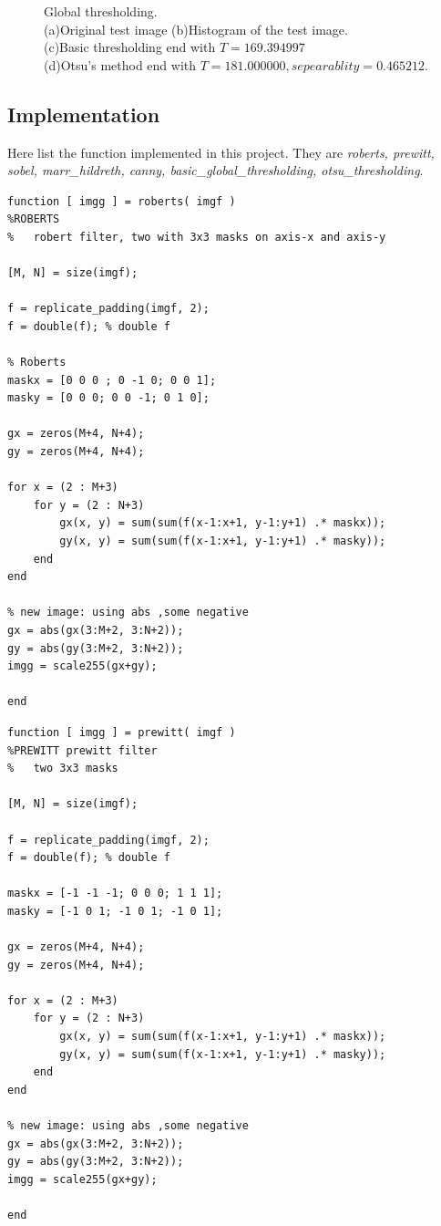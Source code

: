 \begin{figure}[h!]
	\caption{Global thresholding. \\(a)Original test image (b)Histogram of the test image. \\(c)Basic thresholding end with $T=169.394997$\\ (d)Otsu's method end with $T=181.000000, sepearablity=0.465212$.}
  	\label{fig:globalthresholding}
\end{figure}

\clearpage
\subsection{Implementation}
Here list the function implemented in this project. They are \emph{roberts, prewitt, sobel, marr\_hildreth, canny, basic\_global\_thresholding, otsu\_thresholding}.

\lstset{language=Matlab}
\begin{lstlisting}
function [ imgg ] = roberts( imgf )
%ROBERTS 
%   robert filter, two with 3x3 masks on axis-x and axis-y

[M, N] = size(imgf);

f = replicate_padding(imgf, 2);
f = double(f); % double f

% Roberts
maskx = [0 0 0 ; 0 -1 0; 0 0 1];
masky = [0 0 0; 0 0 -1; 0 1 0];

gx = zeros(M+4, N+4);
gy = zeros(M+4, N+4);

for x = (2 : M+3)
    for y = (2 : N+3)
        gx(x, y) = sum(sum(f(x-1:x+1, y-1:y+1) .* maskx));
        gy(x, y) = sum(sum(f(x-1:x+1, y-1:y+1) .* masky));
    end
end

% new image: using abs ,some negative
gx = abs(gx(3:M+2, 3:N+2));
gy = abs(gy(3:M+2, 3:N+2));
imgg = scale255(gx+gy);

end
\end{lstlisting}

\lstset{language=Matlab}
\begin{lstlisting}
function [ imgg ] = prewitt( imgf )
%PREWITT prewitt filter
%   two 3x3 masks

[M, N] = size(imgf);

f = replicate_padding(imgf, 2);
f = double(f); % double f

maskx = [-1 -1 -1; 0 0 0; 1 1 1];
masky = [-1 0 1; -1 0 1; -1 0 1];

gx = zeros(M+4, N+4);
gy = zeros(M+4, N+4);

for x = (2 : M+3)
    for y = (2 : N+3)
        gx(x, y) = sum(sum(f(x-1:x+1, y-1:y+1) .* maskx));
        gy(x, y) = sum(sum(f(x-1:x+1, y-1:y+1) .* masky));
    end
end

% new image: using abs ,some negative
gx = abs(gx(3:M+2, 3:N+2));
gy = abs(gy(3:M+2, 3:N+2));
imgg = scale255(gx+gy);

end
\end{lstlisting}
 
